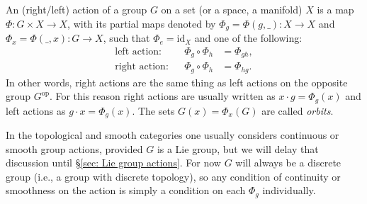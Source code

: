\begin{defn}
    An (right/left) action of a group $G$ on a set (or a space, a manifold) $X$ is a map $\Phi: G\times X\to X$, with its partial maps denoted by $\Phi_g=\Phi (g,\_):X\to X$ and $\Phi_x=\Phi(\_,x):G\to X$, such that $\Phi_e=\mathrm{id}_X$ and one of the following:
    \begin{align}
        \text{left action}:&& \Phi_g\circ \Phi_h&=\Phi_{gh},\\
        \text{right action}:&& \Phi_g\circ \Phi_h&=\Phi_{hg}.
    \end{align}
    In other words, right actions are the same thing as left actions on the opposite group $G^{\mathrm{op}}$. For this reason right actions are usually written as $x\cdot g=\Phi_g(x)$ and left actions as $g\cdot x=\Phi_g(x)$. The sets $G(x)=\Phi_x(G)$ are called \emph{orbits}.
\end{defn}
In the topological and smooth categories one usually considers continuous or smooth group actions, provided $G$ is a Lie group, but we will delay that discussion until \S\ref{sec: Lie group actions}. For now $G$ will always be a discrete group (i.e., a group with discrete topology), so any condition of continuity or smoothness on the action is simply a condition on each $\Phi_g$ individually.

